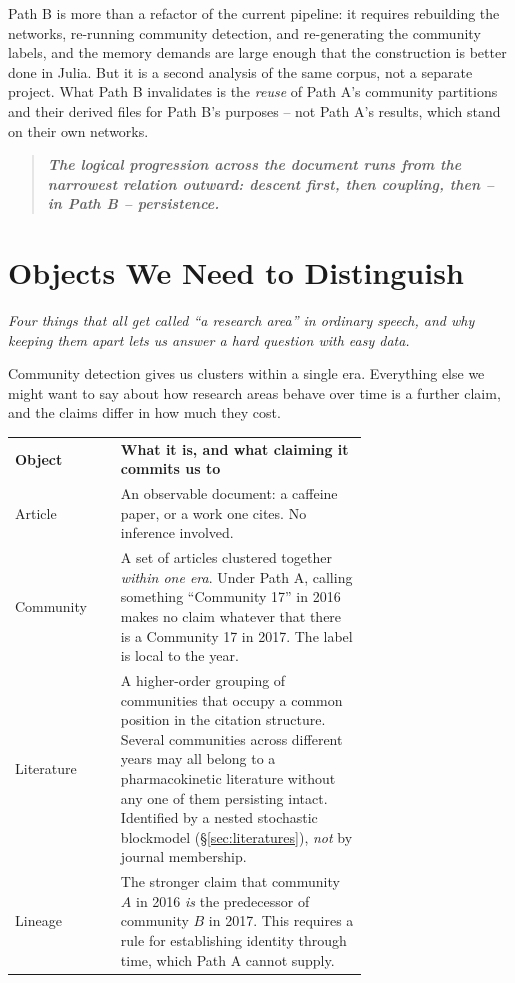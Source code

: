 \documentclass[11pt]{article}
\newcommand{\seccap}[1]{{\slshape\small #1\par}\vspace{0.8em}}
\newcommand{\doublerule}{%
  \specialrule{\lightrulewidth}{0pt}{\doublerulesep}%
  \specialrule{\lightrulewidth}{0pt}{0pt}}
\begin{document}
Path B is more than a refactor of the current pipeline: it requires rebuilding the
networks, re-running community detection, and re-generating the community labels, and
the memory demands are large enough that the construction is better done in Julia.
But it is a second analysis of the same corpus, not a separate project. What Path B
invalidates is the \emph{reuse} of Path A's community partitions and their derived files
for Path B's purposes -- not Path A's results, which stand on their own networks.

\begin{quote}
\textbf{\itshape The logical progression across the document runs from the narrowest
relation outward: descent first, then coupling, then -- in Path B -- persistence.}
\end{quote}

\section{Objects We Need to Distinguish}
\label{sec:objects}
\seccap{Four things that all get called ``a research area'' in ordinary speech, and why
keeping them apart lets us answer a hard question with easy data.}

Community detection gives us clusters within a single era. Everything else we might want
to say about how research areas behave over time is a further claim, and the claims
differ in how much they cost.

\begin{center}
\small
\begin{tabular}{@{}lp{0.70\linewidth}@{}}
\toprule
\textbf{Object} & \textbf{What it is, and what claiming it commits us to}\\
\doublerule
Article    & An observable document: a caffeine paper, or a work one cites. No
             inference involved.\\[3pt]
Community  & A set of articles clustered together \emph{within one era}. Under Path A,
             calling something ``Community 17'' in 2016 makes no claim whatever that
             there is a Community 17 in 2017. The label is local to the year.\\[3pt]
Literature & A higher-order grouping of communities that occupy a common position in
             the citation structure. Several communities across different years may all
             belong to a pharmacokinetic literature without any one of them persisting
             intact. Identified by a nested stochastic blockmodel
             (\S\ref{sec:literatures}), \emph{not} by journal membership.\\[3pt]
Lineage    & The stronger claim that community $A$ in 2016 \emph{is} the predecessor of
             community $B$ in 2017. This requires a rule for establishing identity through
             time, which Path A cannot supply.\\
\bottomrule
\end{tabular}
\end{center}
\end{document}
